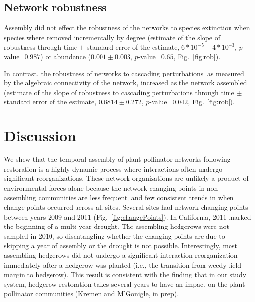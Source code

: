 \documentclass[12pt]{article}
\begin{document}
\subsection*{Network robustness}
Assembly did not effect the robustness of the networks to species
extinction when species where removed incrementally by degree
(estimate of the slope of robustness through time $\pm$ standard error
of the estimate, $6*10^{-5} \pm 4*10^{-3}$, $p$-value=$0.987$) or
abundance ($0.001 \pm 0.003$, $p$-value=$0.65$, Fig.~\ref{fig:rob}).

In contrast, the robustness of networks to cascading perturbations, as
measured by the algebraic connectivity of the network, increased as
the network assembled (estimate of the slope of robustness to
cascading perturbations through time $\pm$ standard error of the
estimate, $0.6814 \pm 0.272$, $p$-value=$0.042$, Fig.~\ref{fig:rob}).

\section*{Discussion}
\label{sec:discussion}

We show that the temporal assembly of plant-pollinator networks
following restoration is a highly dynamic process where interactions
often undergo significant reorganizations. These network organizations
are unlikely a product of environmental forces alone because the
network changing points in non-assembling communities are less
frequent, and few consistent trends in when change points occurred
across all sites. Several sites had network changing points between
years 2009 and 2011 (Fig.~\ref{fig:changePoints}). In California, 2011
marked the beginning of a multi-year drought. The assembling hedgerows
were not sampled in 2010, so disentangling whether the changing points
are due to skipping a year of assembly or the drought is not
possible. Interestingly, most assembling hedgerows did not undergo a
significant interaction reorganization immediately after a hedgerow
was planted (i.e., the transition from weedy field margin to
hedgerow). This result is consistent with the finding that in our
study system, hedgerow restoration takes several years to have an
impact on the plant-pollinator communities (Kremen and M'Gonigle, in
prep).
\end{document}
